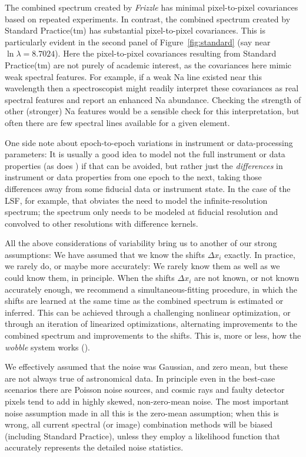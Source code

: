 \documentclass[modern, linenumbers]{aastex631}
\newcommand{\name}{\textsl{Frizzle}}
\begin{document}
The combined spectrum created by \name{} has minimal pixel-to-pixel covariances based on repeated experiments.
In contrast, the combined spectrum created by Standard Practice(tm) has substantial pixel-to-pixel covariances.
This is particularly evident in the second panel of Figure~\ref{fig:standard} (say near $\ln\lambda = 8.7024$).
Here the pixel-to-pixel covariances resulting from Standard Practice(tm) are not purely of academic interest, as the covariances here mimic weak spectral features.
For example, if a weak Na line existed near this wavelength then a spectroscopist might readily interpret these covariances as real spectral features and report an enhanced Na abundance.
Checking the strength of other (stronger) Na features would be a sensible check for this interpretation, but often there are few spectral lines available for a given element.

One side note about epoch-to-epoch variations in instrument or data-processing parameters:
It is usually a good idea to model not the full instrument or data properties (as does \citealt{sp}) if that can be avoided, but rather just the \emph{differences} in instrument or data properties from one epoch to the next, taking those differences away from some fiducial data or instrument state.
In the case of the LSF, for example, that obviates the need to model the infinite-resolution spectrum; the spectrum only needs to be modeled at fiducial resolution and convolved to other resolutions with difference kernels.

All the above considerations of variability bring us to another of our strong assumptions:
We have assumed that we know the shifts $\Delta x_i$ exactly.
In practice, we rarely do, or maybe more accurately: We rarely know them as well as we could know them, in principle.
When the shifts $\Delta x_i$ are not known, or not known accurately enough, we recommend a simultaneous-fitting procedure, in which the shifts are learned at the same time as the combined spectrum is estimated or inferred.
This can be achieved through a challenging nonlinear optimization, or through an iteration of linearized optimizations, alternating improvements to the combined spectrum and improvements to the shifts.
This is, more or less, how the \textsl{wobble} system works (\citealt{wobble}).

We effectively assumed that the noise was Gaussian, and zero mean, but these are not always true of astronomical data.
In principle even in the best-case scenarios there are Poisson noise sources, and cosmic rays and faulty detector pixels tend to add in highly skewed, non-zero-mean noise.
The most important noise assumption made in all this is the zero-mean assumption; when this is wrong, all current spectral (or image) combination methods will be biased (including Standard Practice), unless they employ a likelihood function that accurately represents the detailed noise statistics.
\end{document}

